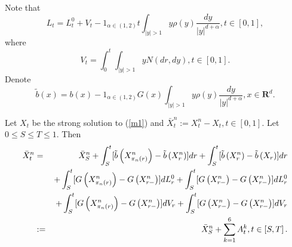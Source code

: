 \documentclass[11pt]{amsart}
\theoremstyle{plain}
\numberwithin{equation}{section}
\begin{document}
Note that 
\begin{equation*}
L_{t}=L_{t}^{0}+V_{t}-1_{\alpha \in \left( 1,2\right) }t\int_{\left\vert
y\right\vert >1}y\rho \left( y\right) \frac{dy}{\left\vert y\right\vert
^{d+\alpha }},t\in \left[ 0,1\right] ,
\end{equation*}where\begin{equation*}
V_{t}=\int_{0}^{t}\int_{\left\vert y\right\vert >1}yN\left( dr,dy\right)
,t\in \left[ 0,1\right] .
\end{equation*}Denote 
\begin{equation*}
\tilde{b}\left( x\right) =b\left( x\right) -1_{\alpha \in \left( 1,2\right)
}G\left( x\right) \int_{\left\vert y\right\vert >1}y\rho \left( y\right)\frac{dy}{\left\vert y\right\vert ^{d+\alpha }},x\in \mathbf{R}^{d}.
\end{equation*}

Let $X_{t}$ be the strong solution to (\ref{m1}) and $\bar{X}_{t}^{n}:=X_{t}^{n}-X_{t},t\in \left[ 0,1\right] $. Let $0\leq S\leq T\leq
1. $ Then\begin{eqnarray}
\bar{X}_{t}^{n} &=&\bar{X}_{S}^{n}+\int_{S}^{t}[\tilde{b}\left( X_{\pi
_{n}\left( r\right) }^{n}\right) -\tilde{b}\left( X_{r}^{n}\right)
]dr+\int_{S}^{t}[\tilde{b}\left( X_{r}^{n}\right) -\tilde{b}\left(
X_{r}\right) ]dr  \notag \\
&&+\int_{S}^{t}[G\left( X_{\pi _{n}\left( r\right) }^{n}\right) -G\left(
X_{r-}^{n}\right) ]dL_{r}^{0}+\int_{S}^{t}[G\left( X_{r-}^{n}\right)
-G\left( X_{r-}^{n}\right) ]dL_{r}^{0}  \notag \\
&&+\int_{S}^{t}[G\left( X_{\pi _{n}\left( r\right) }^{n}\right) -G\left(
X_{r-}^{n}\right) ]dV_{r}+\int_{S}^{t}[G\left( X_{r-}^{n}\right) -G\left(
X_{r-}^{n}\right) ]dV_{r}  \notag \\
&:=&\bar{X}_{S}^{n}+\sum_{k=1}^{6}A_{t}^{k},t\in \left[ S,T\right] .  \notag
\end{eqnarray}
\end{document}
